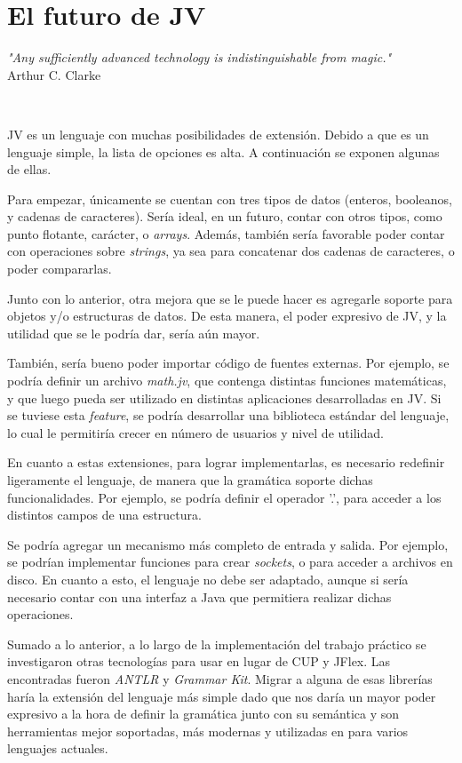 \documentclass[spanish]{article}
\begin{document}
    \section{El futuro de JV}
        \begin{center}
            \par\textit{"Any sufficiently advanced technology is indistinguishable from magic."}\\Arthur C. Clarke\\
        \end{center}
        \\
        \par JV es un lenguaje con muchas posibilidades de extensión. Debido a que es un lenguaje simple, la lista de opciones es alta. A continuación se exponen algunas de ellas.
        \\
        \par Para empezar, únicamente se cuentan con tres tipos de datos (enteros, booleanos, y cadenas de caracteres). Sería ideal, en un futuro, contar con otros tipos, como punto flotante, carácter, o \textit{arrays}. Además, también sería favorable poder contar con operaciones sobre \textit{strings}, ya sea para concatenar dos cadenas de caracteres, o poder compararlas.
        \par Junto con lo anterior, otra mejora que se le puede hacer es agregarle soporte para objetos y/o estructuras de datos. De esta manera, el poder expresivo de JV, y la utilidad que se le podría dar, sería aún mayor.
        \par También, sería bueno poder importar código de fuentes externas. Por ejemplo, se podría definir un archivo \textit{math.jv}, que contenga distintas funciones matemáticas, y que luego pueda ser utilizado en distintas aplicaciones desarrolladas en JV. Si se tuviese esta \textit{feature}, se podría desarrollar una biblioteca estándar del lenguaje, lo cual le permitiría crecer en número de usuarios y nivel de utilidad.
        \par En cuanto a estas extensiones, para lograr implementarlas, es necesario redefinir ligeramente el lenguaje, de manera que la gramática soporte dichas funcionalidades. Por ejemplo, se podría definir el operador '.', para acceder a los distintos campos de una estructura.
        \par Se podría agregar un mecanismo más completo de entrada y salida. Por ejemplo, se podrían implementar funciones para crear \textit{sockets}, o para acceder a archivos en disco. En cuanto a esto, el lenguaje no debe ser adaptado, aunque si sería necesario contar con una interfaz a Java que permitiera realizar dichas operaciones.
            \par Sumado a lo anterior, a lo largo de la implementación del trabajo práctico se investigaron otras tecnologías para usar en lugar de CUP y JFlex. Las encontradas fueron \textit{ANTLR} y \textit{Grammar Kit}. Migrar a alguna de esas librerías haría la extensión del lenguaje más simple dado que nos daría un mayor poder expresivo a la hora de definir la gramática junto con su semántica y son herramientas mejor soportadas, más modernas y utilizadas en para varios lenguajes actuales.
    \clearpage
\end{document}
